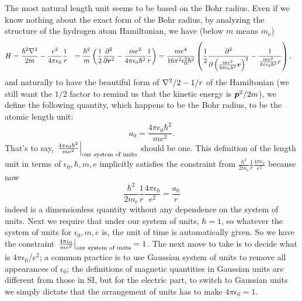 \documentclass[hyperref, a4paper, 12pt]{report}
\def\\{}%
\begin{document}
The most natural length unit seems to be based on the Bohr radius.
Even if we know nothing about the exact form of the Bohr radius,
by analyzing the structure of the hydrogen atom Hamiltonian, 
we have (below $m$ means $m_{\text{e}}$)
\begin{equation*}
    \begin{aligned}
        H &= \frac{\hbar^2 \laplacian}{2m} - \frac{e^2}{4\pi \epsilon_0} \frac{1}{r} \\
        &= \frac{\hbar^2}{m} \left(
            \frac{1}{2} \pdv[2]{\vb*{r}} - \frac{m e^2}{4 \pi \epsilon_0 \hbar^2} \frac{1}{r} 
        \right) \\
        &= \frac{m e^4}{16 \pi^2 \epsilon_0^2 \hbar^2} \left(
            \frac{1}{2} \pdv[2]{
                \left(\frac{m e^2}{4 \pi \epsilon_0 \hbar^2} \vb*{r}\right)
            }
            - \frac{1}{
                \frac{m e^2}{4 \pi \epsilon_0 \hbar^2} r
            }
        \right),
    \end{aligned}
\end{equation*}
and naturally to have the beautiful form of $\laplacian / 2 - 1/r$ of the Hamiltonian
(we still want the $1/2$ factor to remind us that the kinetic energy is $\vb*{p}^2/2m$), 
we define the following quantity, which happens to be the Bohr radius, to be the atomic length unit:
\begin{equation}
    a_0 = \frac{4 \pi \epsilon_0 \hbar^2}{m e^2}.
\end{equation}
That's to say, $\eval{\frac{4 \pi \epsilon_0 \hbar^2}{m e^2}}_{\text{our system of units}}$ should be one.
This definition of the length unit in terms of $\epsilon_0, \hbar, m, e$ 
implicitly satisfies the constraint from 
$\frac{\hbar^2}{2m_\text{e}} \frac{1}{r} \frac{4\pi \epsilon_0}{e^2}$
because now 
\[
    \frac{\hbar^2}{2m_\text{e}} \frac{1}{r} \frac{4\pi \epsilon_0}{e^2} = \frac{a_0}{r}
\]
indeed is a dimensionless quantity without any dependence on the system of units. 
Next we require that under our system of units, $\hbar = 1$,
so whatever the system of units for $\epsilon_0, m, e$ is, 
the unit of time is automatically given.
So we have the constraint $\eval{\frac{4\pi \epsilon_0}{m e^2}}_{\text{our system of units}} = 1$.
The next move to take is to decide what is $4 \pi \epsilon_0 / e^2$;
a common practice is to use Gaussian system of units to remove all appearances of $\epsilon_0$;
the definitions of magnetic quantities in Gaussian units 
are different from those in SI, 
but for the electric part, to switch to Gaussian units 
we simply dictate that the arrangement of units has to make $4 \pi \epsilon_0 = 1$.
\end{document}
